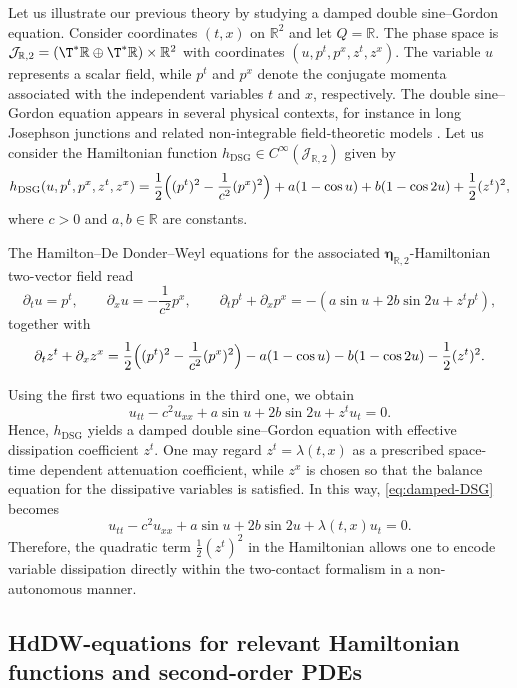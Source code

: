 \documentclass[11pt,a4paper]{article}
\theoremstyle{plain} \newtheorem{theorem}{Theorem}[section] \newtheorem{proposition}[theorem]{Proposition} \newtheorem{corollary}[theorem]{Corollary} \newtheorem{lemma}[theorem]{Lemma} \theoremstyle{definition} \newtheorem{definition}[theorem]{Definition} \theoremstyle{remark} \newtheorem{remark}[theorem]{Remark} \newtheorem{example}[theorem]{Example} %
\begin{document}
Let us illustrate our previous theory by studying a damped double sine--Gordon equation. Consider coordinates \((t,x)\) on \(\mathbb R^2\) and let \(Q=\mathbb R\). The phase space is \(\mathcal J_{\mathbb R,2}=(\T^*\mathbb R\oplus \T^*\mathbb R)\times\mathbb R^2\) with coordinates \((u,p^t,p^x,z^t,z^x)\). The variable \(u\) represents a scalar field, while \(p^t\) and \(p^x\) denote the conjugate momenta associated with the independent variables \(t\) and \(x\), respectively. The double sine--Gordon equation appears in several physical contexts, for instance in long Josephson junctions and related non-integrable field-theoretic models \cite{KasTanHataTaka2001,Popov2005,TakacsWagner2006}. Let us consider the Hamiltonian function \(h_{\mathrm{DSG}}\in C^\infty(\mathcal J_{\mathbb R,2})\) given by
\begin{equation}\label{eq:Hamiltonian-DSG}
h_{\mathrm{DSG}}(u,p^t,p^x,z^t,z^x)
=
\frac12\Bigl((p^t)^2-\frac{1}{c^2}(p^x)^2\Bigr)
+a(1-\cos u)+b(1-\cos 2u)
+\frac12(z^t)^2,
\end{equation}
where \(c>0\) and \(a,b\in\mathbb R\) are constants.

The Hamilton--De Donder--Weyl equations for the associated \(\bm\eta_{\mathbb R,2}\)-Hamiltonian two-vector field read
\[
\partial_t u=p^t,\qquad
\partial_x u=-\frac{1}{c^2}p^x,\qquad
\partial_t p^t+\partial_x p^x=-(a\sin u+2b\sin 2u+z^t p^t),
\]
together with
\[
\partial_t z^t+\partial_x z^x
=
\frac12\Bigl((p^t)^2-\frac{1}{c^2}(p^x)^2\Bigr)
-a(1-\cos u)-b(1-\cos 2u)-\frac12(z^t)^2.
\]

Using the first two equations in the third one, we obtain
\begin{equation}\label{eq:damped-DSG}
u_{tt}-c^2u_{xx}+a\sin u+2b\sin 2u+z^t u_t=0.
\end{equation}
Hence, \(h_{\mathrm{DSG}}\) yields a damped double sine--Gordon equation with effective dissipation coefficient \(z^t\). One may regard \(z^t=\lambda(t,x)\) as a prescribed space-time dependent attenuation coefficient, while \(z^x\) is chosen so that the balance equation for the dissipative variables is satisfied. In this way, \eqref{eq:damped-DSG} becomes
\[
u_{tt}-c^2u_{xx}+a\sin u+2b\sin 2u+\lambda(t,x)u_t=0.
\]
Therefore, the quadratic term \(\frac12(z^t)^2\) in the Hamiltonian allows one to encode variable dissipation directly within the two-contact formalism in a non-autonomous manner.




\subsection{HdDW-equations for relevant Hamiltonian functions and second-order PDEs}\label{Sec:SpecialTypes}
\end{document}
